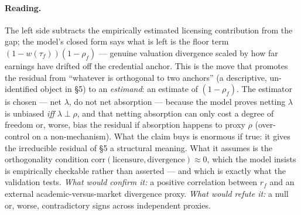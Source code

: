 \documentclass[11pt]{article}
\begin{document}
\paragraph{Reading.} The left side subtracts the empirically estimated licensing contribution from the gap; the model's closed form says what is left is the floor term $(1-w(\tau_f))(1-\rho_f)$ --- genuine valuation divergence scaled by how far earnings have drifted off the credential anchor. This is the move that promotes the residual from ``whatever is orthogonal to two anchors'' (a descriptive, un-identified object in \S5) to an \emph{estimand}: an estimate of $(1-\rho_f)$. The estimator is chosen --- net $\lambda$, do not net absorption --- because the model proves netting $\lambda$ is unbiased \emph{iff} $\lambda \perp \rho$, and that netting absorption can only cost a degree of freedom or, worse, bias the residual if absorption happens to proxy $\rho$ (over-control on a non-mechanism). What the claim buys is enormous if true: it gives the irreducible residual of \S5 a structural meaning. What it assumes is the orthogonality condition $\mathrm{corr}(\text{licensure},\text{divergence})\approx 0$, which the model insists is empirically checkable rather than asserted --- and which is exactly what the validation tests. \emph{What would confirm it:} a positive correlation between $r_f$ and an external academic-versus-market divergence proxy. \emph{What would refute it:} a null or, worse, contradictory signs across independent proxies.
\end{document}
